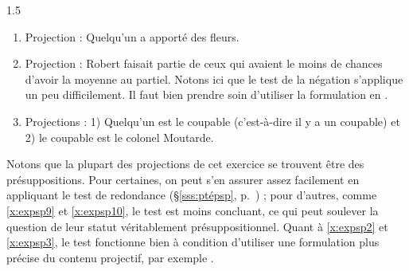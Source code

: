 \begin{Solution}{1.{5}}
\begin{enumerate}
\item %
Projection : Quelqu'un a apporté des fleurs.

\item %
Projection : Robert faisait partie de ceux qui avaient le moins de chances d'avoir la moyenne au partiel.  Notons ici que le test de la négation s'applique un peu
difficilement. Il faut bien prendre soin d'utiliser la formulation en
.

\item %
Projections : 1) Quelqu'un est le coupable (c'est-à-dire  il y a un coupable) et 2)
le coupable est le colonel Moutarde.
\end{enumerate}

Notons que la plupart des projections de cet exercice se trouvent être des présuppositions. Pour certaines, on peut s'en assurer assez facilement en appliquant le test de redondance (\S\ref{sss:ptépsp}, p.~\pageref{p.testAB}) ; pour d'autres, comme \ref{x:expsp9} et \ref{x:expsp10}, le test est moins concluant, ce qui peut soulever la question de leur statut véritablement présuppositionnel. Quant à \ref{x:expsp2} et \ref{x:expsp3}, le test fonctionne bien à condition d'utiliser une formulation plus précise du contenu projectif, par exemple  {\vs} {\zarb}.

\end{Solution}
